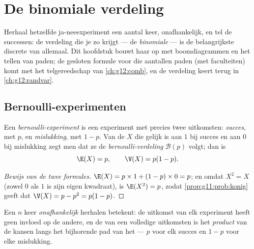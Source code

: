 \chapter{De binomiale verdeling}\label{ch:g11:binom}

Herhaal hetzelfde ja-neeexperiment een aantal keer, onafhankelijk, en tel de
successen: de verdeling die je zo krijgt --- de \emph{binomiale} --- is de
belangrijkste discrete  van allemaal. Dit hoofdstuk bouwt haar op
met boomdiagrammen en het tellen van paden; de gesloten formule voor die
aantallen paden (met faculteiten) komt met het telgereedschap van
\cref{ch:g12:comb}, en de verdeling keert terug in \cref{ch:g12:randvar}.

\section{Bernoulli-experimenten}

\begin{definition}\label{def:g11:binom:bernoulli}
Een \emph{bernoulli-experiment} is een experiment
met precies twee uitkomsten: \emph{succes}, met  $p$, en \emph{mislukking},
met  $1 - p$. Van de  $X$ die gelijk is aan $1$ bij succes
en aan $0$ bij mislukking zegt men dat ze de \emph{bernoulli-verdeling}
$\mathcal B(p)$ volgt; dan is
\[
\E(X) = p,
\qquad
\V(X) = p(1 - p).
\]
\end{definition}

\begin{proof}[Bewijs van de twee formules]
$\E(X) = p \times 1 + (1-p) \times 0 = p$; en omdat $X^2 = X$ (zowel $0$ als
$1$ is zijn eigen kwadraat), is $\E(X^2) = p$, zodat
\cref{prop:g11:prob:konig} geeft dat $\V(X) = p - p^2 = p(1-p)$.
\end{proof}

\begin{definition}\label{def:g11:binom:repeated}
Een  $n$ keer \emph{onafhankelijk} herhalen betekent: de
uitkomst van elk experiment heeft geen invloed op de andere, en de  van
een volledige  uitkomsten is het \emph{product} van de kansen langs het
bijhorende pad van het  --- $p$ voor elk succes en $1 - p$ voor
elke mislukking.
\end{definition}

